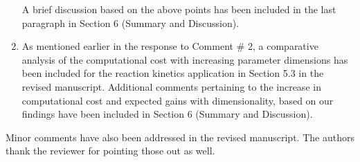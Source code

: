 \documentclass[11pt,final]{article}
\newcommand{\referee}[1]{\vspace{.1ex}\noindent{\textcolor{blue}{#1}}}
\begin{document}
\begin{enumerate}
A brief discussion based on the above points has been included in the last paragraph in
Section 6 (Summary and Discussion).

\item 
\referee{The reviewer would like to see some comments on the change of computational
cost of the proposed approach with respect to the increase of parameter dimensions.}

As mentioned earlier in the response to Comment $\#$ 2, a comparative analysis of the
computational cost with increasing parameter dimensions has been included for the reaction
kinetics application in Section 5.3 in the revised manuscript. Additional comments pertaining
to the increase in computational cost and expected gains with dimensionality, based on
our findings have been included in Section 6 (Summary and Discussion).

\end{enumerate}

Minor comments have also been addressed in the revised manuscript. The authors thank
the reviewer for pointing those out as well. 
\end{document}
